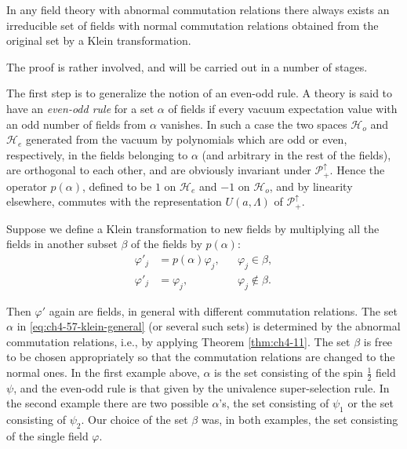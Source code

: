 \begin{theorem}[4-12]\label{thm:ch4-12}

In any field theory with abnormal commutation relations there always exists an
irreducible set of fields with normal commutation relations obtained from the
original set by a Klein transformation.
\end{theorem}

\par\medskip\noindent The proof is rather involved, and will be carried out in
a number of stages.

The first step is to generalize the notion of an even-odd rule.  A theory is
said to have an \emph{even-odd rule} for a set $\alpha$ of fields if every
vacuum expectation value with an odd number of fields from $\alpha$ vanishes.
In such a case the two spaces $\mathcal H_o$ and $\mathcal H_e$ generated from
the vacuum
by polynomials which are odd or even, respectively, in the fields belonging
to $\alpha$ (and arbitrary in the rest of the fields), are orthogonal to each
other, and are obviously invariant under $\mathcal P_+^\uparrow$.  Hence the
operator $p(\alpha)$, defined to be $1$ on $\mathcal H_e$ and $-1$ on
$\mathcal H_o$, and by linearity elsewhere, commutes with the representation
$U(a,\Lambda)$ of $\mathcal P_+^\uparrow$.

Suppose we define a Klein transformation to new fields by multiplying all the
fields in another subset $\beta$ of the fields by $p(\alpha)$:
\begin{equation}
\begin{aligned}
  \varphi'_j&=p(\alpha)\varphi_j, &&\varphi_j\in\beta,\\
  \varphi'_j&=\varphi_j, &&\varphi_j\notin\beta.
\end{aligned}
  \tag{4-57}\label{eq:ch4-57-klein-general}
\end{equation}

Then $\varphi'$ again are fields, in general with different commutation
relations.  The set $\alpha$ in \eqref{eq:ch4-57-klein-general} (or several such sets) is determined by
the abnormal commutation relations, i.e., by applying Theorem \ref{thm:ch4-11}.  The set
$\beta$ is free to be chosen appropriately so that the commutation relations
are changed to the normal ones.  In the first example above, $\alpha$ is the
set consisting of the spin $\frac12$ field $\psi$, and the even-odd rule is
that given by the univalence super-selection rule.  In the second example
there are two possible $\alpha$'s, the set consisting of $\psi_1$ or the set
consisting of $\psi_2$.  Our choice of the set $\beta$ was, in both examples,
the set consisting of the single field $\varphi$.


